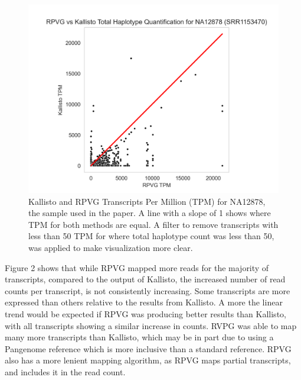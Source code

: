\documentclass{article}
\begin{document}
\begin{figure}[H]
  \centering
  \includegraphics[width=0.8\linewidth]{Kallisto_vs_VG_Total_TPM.png}
  \caption{Kallisto and RPVG Transcripts Per Million (TPM) for NA12878, the sample used in the paper. A line with a slope of 1 shows
  where TPM for both methods are equal. A filter to remove transcripts with less than 50 TPM for where total haplotype 
  count was less than 50, was applied to make visualization more clear.}
\end{figure}

\vspace{5em} %

Figure 2 shows that while RPVG mapped more reads for the majority of transcripts, compared to
the output of Kallisto, the increased number of read counts per transcript, is not consistently increasing. 
Some transcripts are more expressed than others relative to the results from Kallisto. A more 
the linear trend would be expected if RPVG was producing better 
results than Kallisto, with all transcripts showing a similar increase in counts.
RVPG was able to map many more transcripts than Kallisto, which may be in part due to using
a Pangenome reference which is more inclusive than a standard reference. RPVG also has a 
more lenient mapping algorithm, as RPVG maps partial transcripts, and includes it in the read count. 
\end{document}
